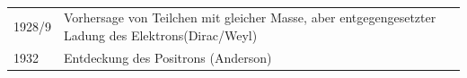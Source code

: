 	\\
	\begin{tabular}{l l}
		1928/9 & Vorhersage von Teilchen mit gleicher Masse, aber entgegengesetzter Ladung des Elektrons(Dirac/Weyl) \\
		1932 & Entdeckung des Positrons (Anderson)
	\end{tabular}